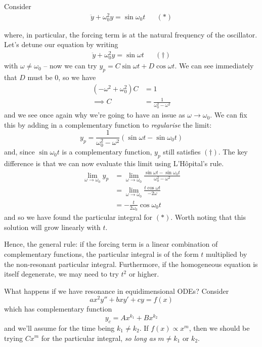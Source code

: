 \documentclass{../template/note}
\begin{document}
    \begin{example}
        Consider
        \begin{align*}
            \ddot y + \omega_0^2 y = \sin \omega_0 t && (*)
        \end{align*}
        
        where, in particular, the forcing term is at the natural frequency of the oscillator. Let's detune our equation by writing
        \begin{align*}
            \ddot y + \omega_0^2 y = \sin \omega t && (\dagger)
        \end{align*}
        with \(\omega \neq \omega_0\) -- now we can try \(y_p = C \sin \omega t + D \cos \omega t\). We can see immediately that \(D\) must be 0, so we have
        \begin{align*}
            (-\omega^2 + \omega_0^2)C &= 1 \\
            \implies C &= \frac{1}{\omega_0^2 - \omega^2}
        \end{align*}
        and we see once again why we're going to have an issue as \(\omega \to \omega_0\). We can fix this by adding in a complementary function to \emph{regularise} the limit:
        \[
            y_p = \frac{1}{\omega_0^2 - \omega^2}(\sin \omega t - \sin \omega_0 t)
        \]
        and, since \(\sin \omega_0 t\) is a complementary function, \(y_p\) still satisfies \((\dagger)\). The key difference is that we can now evaluate this limit using L'H\^opital's rule.
        \begin{align*}
            \lim_{\omega \to \omega_0} y_p &= \lim_{\omega \to \omega_0} \frac{\sin \omega t - \sin \omega_0 t}{\omega_0^2 - \omega^2} \\
            &= \lim_{\omega \to \omega_0} \frac{t \cos \omega t}{-2 \omega} \\
            &= -\frac{t}{2 \omega_0} \cos \omega_0 t
        \end{align*}
        and so we have found the particular integral for \((*)\). Worth noting that this solution will grow linearly with \(t\).
    \end{example}
    
    Hence, the general rule: if the forcing term is a linear combination of complementary functions, the particular integral is of the form \(t\) multiplied by the non-resonant particular integral. Furthermore, if the homogeneous equation is itself degenerate, we may need to try \(t^2\) or higher.

    What happens if we have resonance in equidimensional ODEs? Consider
    \[
        ax^2 y'' + bx y' + cy = f(x)
    \]
    which has complementary function
    \[
        y_c = Ax^{k_1} + Bx^{k_2}
    \]
    and we'll assume for the time being \(k_1 \neq k_2\). If \(f(x) \propto x^m\), then we should be trying \(Cx^m\) for the particular integral, \emph{so long as} \(m \neq k_1\) or \(k_2\).
\end{document}
